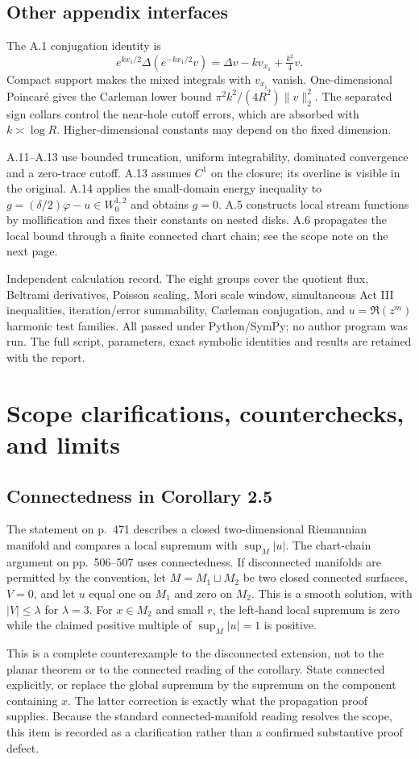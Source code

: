 \documentclass[10pt]{article}
\begin{document}
\subsection*{Other appendix interfaces}
The A.1 conjugation identity is \[e^{kx_1/2}\Delta(e^{-kx_1/2}v)
 =\Delta v-kv_{x_1}+\tfrac{k^2}{4}v.\] Compact support makes the mixed integrals with \(v_{x_1}\) vanish. One-dimensional Poincaré gives the Carleman lower bound \(\pi^2k^2/(4R^2)\|v\|_2^2\). The separated sign collars control the near-hole cutoff errors, which are absorbed with \(k\asymp\log R\). Higher-dimensional constants may depend on the fixed dimension.\par
A.11–A.13 use bounded truncation, uniform integrability, dominated convergence and a zero-trace cutoff. A.13 assumes \(C^1\) on the closure; its overline is visible in the original. A.14 applies the small-domain energy inequality to \(g=(\delta/2)\varphi-u\in W^{1,2}_0\) and obtains \(g=0\). A.5 constructs local stream functions by mollification and fixes their constants on nested disks. A.6 propagates the local bound through a finite connected chart chain; see the scope note on the next page.\par
Independent calculation record. The eight groups cover the quotient flux, Beltrami derivatives, Poisson scaling, Mori scale window, simultaneous Act III inequalities, iteration/error summability, Carleman conjugation, and \(u=\Re(z^m)\) harmonic test families. All passed under Python/SymPy; no author program was run. The full script, parameters, exact symbolic identities and results are retained with the report.\par
\section*{Scope clarifications, counterchecks, and limits}
\subsection*{Connectedness in Corollary 2.5}
The statement on p. 471 describes a closed two-dimensional Riemannian manifold and compares a local supremum with \(\sup_M|u|\). The chart-chain argument on pp. 506–507 uses connectedness. If disconnected manifolds are permitted by the convention, let \(M=M_1\sqcup M_2\) be two closed connected surfaces, \(V=0\), and let \(u\) equal one on \(M_1\) and zero on \(M_2\). This is a smooth solution, with \(|V|\le\lambda\) for \(\lambda=3\). For \(x\in M_2\) and small \(r\), the left-hand local supremum is zero while the claimed positive multiple of \(\sup_M|u|=1\) is positive.\par
This is a complete counterexample to the disconnected extension, not to the planar theorem or to the connected reading of the corollary. State connected explicitly, or replace the global supremum by the supremum on the component containing \(x\). The latter correction is exactly what the propagation proof supplies. Because the standard connected-manifold reading resolves the scope, this item is recorded as a clarification rather than a confirmed substantive proof defect.\par
\end{document}

